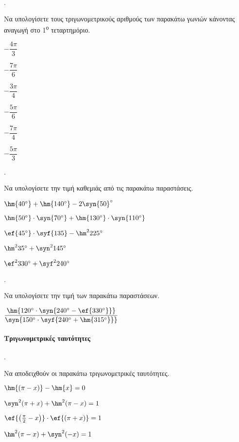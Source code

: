 \documentclass[11pt,a4paper,twocolumn]{article}
\newcounter{askhsh}
\newcommand{\askhsh}{{\large\theaskhsh.}\ \addtocounter{askhsh}{1}}
\newcommand{\tss}[1]{\textsuperscript{#1}}
\begin{document}
\askhsh Να υπολογίσετε τους τριγωνομετρικούς αριθμούς των παρακάτω γωνιών κάνοντας αναγωγή στο 1\tss{ο} τεταρτημόριο.
\begin{multicols}{3}
\begin{alist}
\item $ -\dfrac{4\pi}{3} $
\item $ -\dfrac{7\pi}{6} $
\item $ -\dfrac{3\pi}{4} $
\item $ -\dfrac{5\pi}{6} $
\item $ -\dfrac{7\pi}{4} $
\item $ -\dfrac{5\pi}{3} $
\end{alist}
\end{multicols}
\askhsh Να υπολογίσετε την τιμή καθεμιάς από τις παρακάτω παραστάσεις.
\begin{alist}
\item $ \hm{40\degree}+\hm{140\degree}-2\syn{50}\degree $
\item $ \hm{50\degree}\cdot\syn{70\degree}+\hm{130\degree}\cdot\syn{110\degree} $
\item $ \ef{45\degree}\cdot \syf{135}-\hm^2{225\degree} $
\item $ \hm^2{35\degree}+\syn^2{145\degree} $
\item $ \ef^2{330\degree}+\syf^2{240\degree} $
\end{alist}
\askhsh Να υπολογίσετε την τιμή των παρακάτω παραστάσεων.
\begin{alist}
\item $\dfrac{\hm{120\degree\cdot\syn{240\degree-\ef{330\degree}}}}{\syn{150\degree\cdot\syf{240\degree+\hm{315\degree}}}}$
\end{alist}
\paragraph{Τριγωνομετρικές ταυτότητες}
\askhsh
Να αποδειχθούν οι παρακάτω τριγωνομετρικές ταυτότητες.
\begin{alist}
\item $ \hm{\left( \pi-x\right) }-\hm{x}=0 $
\item $ \syn^2{(\pi+x)}+\hm^2{(\pi-x)}=1 $
\item $ \ef{\left( \frac{\pi}{2}-x\right) }\cdot\ef{\left( \pi+x\right) }=1 $
\item $ \hm^2{(\pi-x)}+\syn^2{(-x)}=1 $
\end{alist}
\end{document}
